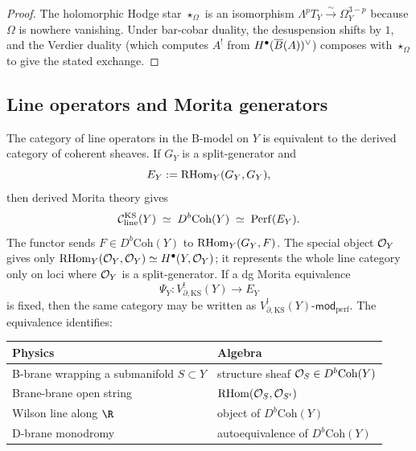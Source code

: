 \begin{proof}
The holomorphic Hodge star $\star_\Omega$ is an isomorphism
$\Lambda^p T_Y\xrightarrow{\sim}\Omega^{3-p}_Y$ because $\Omega$
is nowhere vanishing. Under bar-cobar duality, the desuspension
shifts by $1$, and the Verdier duality (which computes $A^!$
from $H^\bullet(\overline{B}(A))^\vee$) composes with $\star_\Omega$
to give the stated exchange.
\end{proof}


\subsection{Line operators and Morita generators}

\begin{theorem}
The category of line operators in the B-model on $Y$ is equivalent
to the derived category of coherent sheaves. If $G_Y$ is a
split-generator and
\[
 E_Y:=\operatorname{RHom}_Y(G_Y,G_Y),
\]
then derived Morita theory gives
\begin{equation}%
\cC_{\mathrm{line}}^{\mathrm{KS}}(Y)
\;\simeq\;
D^b\mathrm{Coh}(Y)
\;\simeq\;
\Perf(E_Y).
\end{equation}
The functor sends $F\in D^b\mathrm{Coh}(Y)$ to
$\operatorname{RHom}_Y(G_Y,F)$. The special object $\mathcal O_Y$ gives only
$\operatorname{RHom}_Y(\mathcal O_Y,\mathcal O_Y)\simeq H^\bullet(Y,\mathcal O_Y)$; it represents the
whole line category only on loci where $\mathcal O_Y$ is a split-generator.
If a dg Morita equivalence
\[
 \Psi_Y\colon V_{\partial,\mathrm{KS}}^!(Y)\longrightarrow E_Y
\]
is fixed, then the same category may be written as
$V_{\partial,\mathrm{KS}}^!(Y)\text{-}\mathsf{mod}_{\mathrm{perf}}$.
The equivalence identifies:
\begin{center}
\renewcommand{\arraystretch}{1.2}
\begin{tabular}{ll}
\textbf{Physics} & \textbf{Algebra} \\
\hline
B-brane wrapping a submanifold $S\subset Y$
& structure sheaf $\mathcal O_S\in D^b\mathrm{Coh}(Y)$ \\
Brane-brane open string & $\operatorname{RHom}(\mathcal O_S,\mathcal O_{S'})$ \\
Wilson line along $\R$ & object of $D^b\mathrm{Coh}(Y)$ \\
D-brane monodromy & autoequivalence of $D^b\mathrm{Coh}(Y)$
\end{tabular}
\end{center}
\end{theorem}

